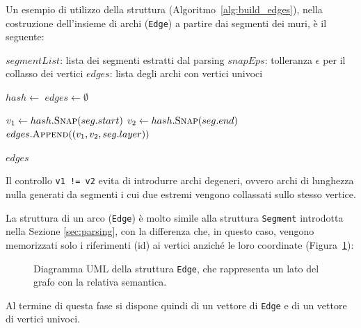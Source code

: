 Un esempio di utilizzo della struttura (Algoritmo~\ref{alg:build_edges}), nella costruzione dell'insieme di archi (\texttt{Edge}) a partire dai segmenti dei muri, è il seguente:
\begin{algorithm}[htbp]
	\caption{Costruzione degli archi a partire dai segmenti, con collasso dei vertici}
	\label{alg:build_edges}
	\begin{algorithmic}[1]
		\Require $segmentList$: lista dei segmenti estratti dal parsing
		\Require $snapEps$: tolleranza $\epsilon$ per il collasso dei vertici
		\Ensure $edges$: lista degli archi con vertici univoci
		
		\State $hash \gets$ 
		\State $edges \gets \emptyset$
		
		\State $v_1 \gets hash.\Call{Snap}{seg.start}$
		\State $v_2 \gets hash.\Call{Snap}{seg.end}$
		\State $edges.\Call{Append}{(v_1, v_2, seg.layer)}$
		\EndIf
		\EndFor
		
		\State \Return $edges$
	\end{algorithmic}
\end{algorithm}

Il controllo \texttt{v1 != v2} evita di introdurre archi degeneri, ovvero archi di lunghezza nulla generati da segmenti i cui due estremi vengono collassati sullo stesso vertice.

La struttura di un arco (\texttt{Edge}) è molto simile alla struttura \texttt{Segment} introdotta nella Sezione \ref{sec:parsing}, con la differenza che, in questo caso, vengono memorizzati solo i riferimenti (id) ai vertici anziché le loro coordinate (Figura~\ref{fig:edge-uml}):
\begin{figure}[H]
	\centering
	\caption{Diagramma UML della struttura \texttt{Edge}, che rappresenta un lato del grafo con la relativa semantica.}
	\label{fig:edge-uml}
\end{figure}

Al termine di questa fase si dispone quindi di un vettore di \texttt{Edge} e di un vettore di vertici univoci.